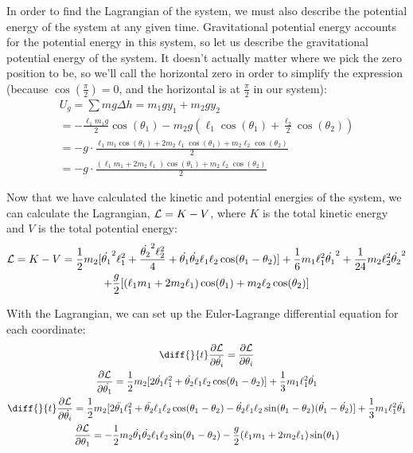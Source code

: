 \documentclass[]{article}
\begin{document}
In order to find the Lagrangian of the system, we must also describe the potential energy of the system at any given time. Gravitational potential energy accounts for the potential energy in this system, so let us describe the gravitational potential energy of the system. It doesn't actually matter where we pick the zero position to be, so we'll call the horizontal zero in order to simplify the expression (because $\cos(\frac{\pi}{2}) = 0$, and the horizontal is at $\frac{\pi}{2}$ in our system):
\begin{gather*}
	U_g = \sum mg\Delta h = m_1gy_1 + m_2gy_2 \\
	= -\frac{\ell_1m_1g}{2}\cos(\theta_1) - m_2g(\ell_1\cos(\theta_1) + \frac{\ell_2}{2}\cos(\theta_2)) \\
	= -g\cdot\frac{\ell_1m_1\cos(\theta_1) + 2m_2\ell_1\cos(\theta_1) + m_2\ell_2\cos(\theta_2)}{2} \\
	= -g\cdot\frac{(\ell_1m_1 + 2m_2\ell_1)\cos(\theta_1) + m_2\ell_2\cos(\theta_2)}{2}
\end{gather*}

Now that we have calculated the kinetic and potential energies of the system, we can calculate the Lagrangian, $\mathcal{L} = K - V$, where $K$ is the total kinetic energy and $V$ is the total potential energy:
\begin{gather*}
	\mathcal{L} = K - V = \frac12m_2[\dot{\theta_1}^2\ell_1^2 + \frac{\dot{\theta_2}^2\ell_2^2}{4} + \dot{\theta_1}\dot{\theta_2}\ell_1\ell_2\cos(\theta_1 - \theta_2)] + \frac16m_1\ell_1^2\dot{\theta_1}^2 + \frac{1}{24}m_2\ell_2^2\dot{\theta_2}^2 \\ + \frac{g}{2}[(\ell_1m_1 + 2m_2\ell_1)\cos(\theta_1) + m_2\ell_2\cos(\theta_2)]
\end{gather*}

With the Lagrangian, we can set up the Euler-Lagrange differential equation for each coordinate:
\begin{gather*}
	\diff{}{t}\frac{\partial \lagr}{\partial \dot{\theta_i}} = \frac{\partial \lagr}{\partial \theta_i} \\
	\frac{\partial \lagr}{\partial \dot{\theta_1}} = \frac12m_2[2\dot{\theta_1}\ell_1^2 + \dot{\theta_2}\ell_1\ell_2\cos(\theta_1 - \theta_2)] + \frac13m_1\ell_1^2\dot{\theta_1} \\
	\diff{}{t} \frac{\partial \lagr}{\partial \dot{\theta_i}} = \frac12m_2[2\ddot{\theta_1}\ell_1^2 + \ddot{\theta_2}\ell_1\ell_2\cos(\theta_1 - \theta_2) - \dot{\theta_2}\ell_1\ell_2\sin(\theta_1 - \theta_2)(\dot{\theta_1} - \dot{\theta_2})] + \frac13m_1\ell_1^2\ddot{\theta_1} \\
	\frac{\partial \lagr}{\partial \theta_1} = -\frac12m_2\dot{\theta_1}\dot{\theta_2}\ell_1\ell_2\sin(\theta_1 - \theta_2) - \frac{g}{2}(\ell_1m_1 + 2m_2\ell_1)\sin(\theta_1)
\end{gather*}
\end{document}
